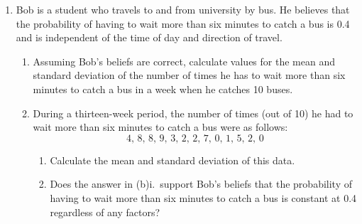 \documentclass[12pt]{scrartcl}
\begin{document}
\begin{enumerate}[label=\textbf{\arabic*.}]
\begin{enumerate}[label=(\alph*)]
\item
\begin{align*}
P(X\ge 3)
&=\sum_{k=3}^{5}\binom{5}{k}(0.15)^k(0.85)^{5-k}\\
&=1-P(X\le 2)\\
&\approx 1-0.973388125\\
&\approx 0.026611875.
\end{align*}

\item For a binomial random variable, the mean and variance are
\[
E(X)=np,\qquad \mathrm{Var}(X)=np(1-p).
\]
Hence
\begin{align*}
    E(X) & = 5(0.15) \\ 
         & =0.75
\end{align*}
and
\begin{align*}
    \sigma & = \sqrt{\mathrm{Var}(X)}\\
           & =\sqrt{5(0.15)(0.85)}\\
           & =\sqrt{0.6375}\\
           & \approx 0.798.
\end{align*}
\end{enumerate}

\newpage
\item Bob is a student who travels to and from university by bus. He believes that the probability of having to wait more than six minutes to catch a bus is 0.4
and is independent of the time of day and direction of travel.

\begin{enumerate}[label=(\alph*)]
\item Assuming Bob's beliefs are correct, calculate values for the mean and standard deviation of the number of times he has to wait more than six minutes to catch a bus
in a week when he catches 10 buses.
\item During a thirteen-week period, the number of times (out of 10) he had to wait more than six minutes to catch a bus were as follows:
\[
4,\,8,\,8,\,9,\,3,\,2,\,2,\,7,\,0,\,1,\,5,\,2,\,0
\]
\begin{enumerate}[label=\roman*.]
\item Calculate the mean and standard deviation of this data.
\item Does the answer in (b)i.\ support Bob's beliefs that the probability of having to wait more than six minutes to catch a bus is constant at 0.4 regardless of any factors?
\end{enumerate}
\end{enumerate}


\end{enumerate}
\end{document}
